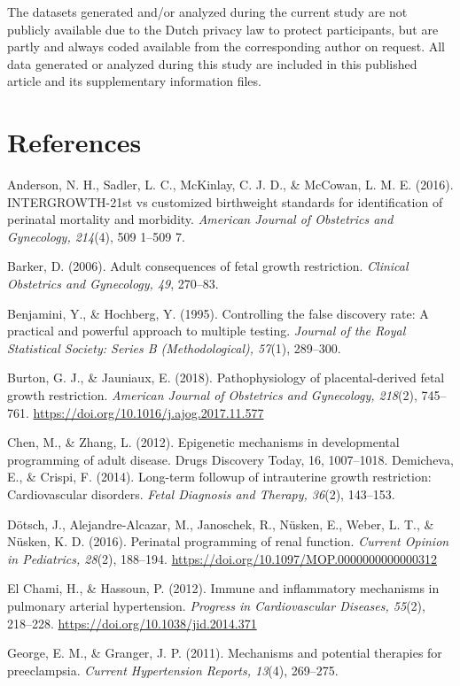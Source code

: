 \documentclass[authordate, empirical]{jote-new-article}
\begin{document}
The datasets generated and/or analyzed during the current study are not publicly available due to the Dutch privacy law to protect participants, but are partly and always coded available from the corresponding author on request. All data generated or analyzed during this study are included in this published article and its supplementary information files.

\section{References}

Anderson, N. H., Sadler, L. C., McKinlay, C. J. D., \& McCowan, L. M. E. (2016). INTERGROWTH-21st vs customized birthweight standards for identification of perinatal mortality and morbidity. \emph{American Journal of Obstetrics and Gynecology, 214}(4), 509 1–509 7.

Barker, D. (2006). Adult consequences of fetal growth restriction. \emph{Clinical Obstetrics and Gynecology, 49}, 270–83.

Benjamini, Y., \& Hochberg, Y. (1995). Controlling the false discovery rate: A practical and powerful approach to multiple testing. \emph{Journal of the Royal Statistical Society: Series B (Methodological), 57}(1), 289–300.

Burton, G. J., \& Jauniaux, E. (2018). Pathophysiology of placental-derived fetal growth restriction. \emph{American Journal of Obstetrics and Gynecology, 218}(2), 745–761. \url{https://doi.org/10.1016/j.ajog.2017.11.577}

Chen, M., \& Zhang, L. (2012). Epigenetic mechanisms in developmental programming of adult disease. Drugs Discovery Today, 16, 1007–1018. Demicheva, E., \& Crispi, F. (2014). Long-term followup of intrauterine growth restriction: Cardiovascular disorders. \emph{Fetal Diagnosis and Therapy, 36}(2), 143–153.

Dötsch, J., Alejandre-Alcazar, M., Janoschek, R., Nüsken, E., Weber, L. T., \& Nüsken, K. D. (2016). Perinatal programming of renal function. \emph{Current Opinion in Pediatrics, 28}(2), 188–194. \url{https://doi.org/10.1097/MOP.0000000000000312}

El Chami, H., \& Hassoun, P. (2012). Immune and inflammatory mechanisms in pulmonary arterial hypertension. \emph{Progress in Cardiovascular Diseases, 55}(2), 218–228. \url{https://doi.org/10.1038/jid.2014.371}

George, E. M., \& Granger, J. P. (2011). Mechanisms and potential therapies for preeclampsia. \emph{Current Hypertension Reports, 13}(4), 269–275.
\end{document}
